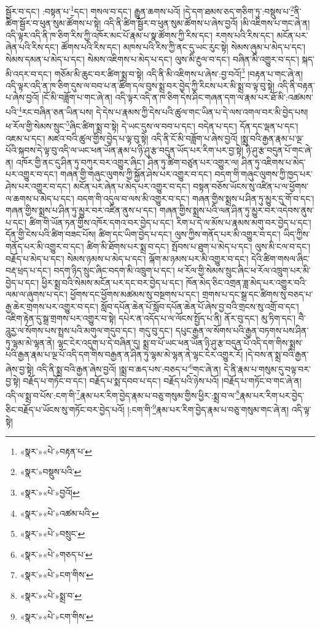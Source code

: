 སྦྱོར་བ་དང་། :བསྟན་པ་\footnote{«སྣར་»«པེ་»བརྟན་པ་}དང་། གསལ་བ་དང་། རྒྱུན་ཆགས་པའོ། །དེ་དག་ཐམས་ཅད་གཅིག་ཏུ་:བསྡུས་པ་\footnote{«སྣར་»བསྡུས་པའི་}ནི་ཚིག་སྦྱོར་བ་ཕུན་སུམ་ཚོགས་པ་སྟེ། འདི་ནི་ཚིག་སྦྱོར་བ་ཕུན་སུམ་ཚོགས་པ་ཞེས་བྱའོ། །མི་འཇིགས་པ་གང་ཞེ་ན། འདི་ལྟར་འདི་ནི་ཁ་ཅིག་རིས་ཀྱི་འཁོར་མང་པོ་རྣམ་པ་སྣ་ཚོགས་ཀྱི་རིས་དང་། རགས་པའི་རིས་དང་། མངོན་པར་ཞེན་པའི་རིས་དང་། ཚོགས་པའི་རིས་དང་། མཁས་པའི་རིས་ཀྱི་ནང་དུ་ཡང་རུང་སྟེ། སེམས་ཞུམ་པ་མེད་པ་དང་། སེམས་དམན་པ་མེད་པ་དང་། སེམས་འཇིགས་པ་མེད་པ་དང་། ལུས་མི་རྔུལ་བ་དང་། བཞིན་མི་འགྱུར་བ་དང་། སྐད་མི་འདར་བ་དང་། གཅོམ་མི་ཆུང་བར་ཚིག་སྨྲ་བ་སྟེ། འདི་ནི་མི་འཇིགས་པ་ཞེས་:བྱ་བའོ།\footnote{«སྣར་»«པེ་»བྱའོ།} །བརྟན་པ་གང་ཞེ་ན། འདི་ལྟར་འདི་ན་ཁ་ཅིག་དུས་ལ་བབ་པ་ན་ཚིག་དལ་བུས་སྨྲ་བར་བྱེད་ཀྱི་རིངས་པར་མི་སྨྲ་བ་ལྟ་བུ་སྟེ། འདི་ནི་བརྟན་པ་ཞེས་བྱའོ། །ངོ་མི་བཟློག་པ་གང་ཞེ་ན། འདི་ལྟར་འདི་ན་ཁ་ཅིག་དེས་ཤིང་གཞན་དག་ལ་རྣམ་པར་ཐོ་མི་:འཚམས་པའི་\footnote{«སྣར་»«པེ་»འཚམ་པའི་}རང་བཞིན་ཅན་ཡིན་པས། དེ་དེས་པ་རྣམས་ཀྱི་དེས་པའི་ཚུལ་གང་ཡིན་པ་དེ་ལས་འགལ་བར་མི་བྱེད་པས། ཕ་རོལ་གྱི་སེམས་སྲུང་\footnote{«སྣར་»«པེ་»བསྲུང་}ཞིང་ཚིག་སྨྲ་བ་སྟེ། དེ་ཡང་དུས་ལ་བབ་པ་དང་། བདེན་པ་དང་། དོན་དང་ལྡན་པ་དང་། འཇམ་པ་དང་། མཛའ་བའི་ཚུལ་གྱིས་བྱེད་པ་ལྟ་བུ་སྟེ། འདི་ནི་ངོ་མི་བཟློག་པ་ཞེས་བྱའོ། །སྨྲ་བའི་རྒྱན་རྣམ་པ་ལྔ་པོའི་སྐབས་དེ་ལྟ་བུ་འདི་ལ་ཡང་ཕན་ཡོན་རྣམ་པ་ཉི་ཤུ་རྩ་བདུན་ཡོད་པར་རིག་པར་བྱ་སྟེ། ཉི་ཤུ་རྩ་བདུན་པོ་གང་ཞེ་ན། འཁོར་གྱི་ནང་དུ་ཤིན་ཏུ་བཀུར་བར་འགྱུར་ཞིང་། ཤིན་ཏུ་ཚིག་བཙུན་པར་འགྱུར་ལ། ཤིན་ཏུ་འཇིགས་པ་མེད་པར་འགྱུར་བ་དང་། གཞན་གྱི་གཞུང་ལུགས་ཀྱི་སྐྱོན་ཤེས་པར་འགྱུར་བ་དང་། བདག་གི་གཞུང་ལུགས་ཀྱི་ཁྱད་པར་ཤེས་པར་འགྱུར་བ་དང་། མངོན་པར་ཞེན་པ་མེད་པར་འགྱུར་བ་དང་། བསྟན་བཅོས་ཡོངས་སུ་འཛིན་པ་ལ་ཕྱོགས་ལ་ཆགས་པ་མེད་པ་དང་། བདག་གི་འདུལ་བ་ལས་མི་འགྱུར་བ་དང་། གཞན་གྱིས་སྨྲས་པ་ཤིན་ཏུ་མྱུར་དུ་གོ་བ་དང་། གཞན་གྱིས་སྨྲས་པ་ཤིན་ཏུ་མྱུར་བར་འཛིན་ནུས་པ་དང་། གཞན་གྱིས་སྨྲས་པའི་ལན་ཤིན་ཏུ་མྱུར་བར་འདེབས་ནུས་པ་དང་། ཚིག་གི་ཡོན་ཏན་གྱིས་འཁོར་དགའ་བར་བྱེད་པ་དང་། རིག་པ་དེ་ལ་མོས་པ་རྣམས་མགུ་བར་བྱེད་པ་དང་། དོན་གྱི་ངེས་པའི་ཚིག་བཟང་པོས། ཚིག་དང་ཡིག་བྱེད་པ་དང་། ལུས་ཀྱིས་གནོད་པར་མི་འགྱུར་བ་དང་། ཡིད་ཀྱིས་གནོད་པར་མི་འགྱུར་བ་དང་། ཚིག་མི་ཐོགས་པར་སྨྲ་བ་དང་། སྤོབས་པ་ཐུག་པ་མེད་པ་དང་། ལུས་མི་ངལ་བ་དང་། བརྗོད་པ་མེད་པ་དང་། སེམས་ཉམས་པ་མེད་པ་དང་། ལྐོག་མ་ཉམས་པར་མི་འགྱུར་བ་དང་། དེའི་ཚིག་གསལ་ཞིང་བརྡ་ཕྲད་པ་དང་། བདག་ཉིད་སྲུང་ཞིང་བདག་མི་འཁྲུག་པ་དང་། ཕ་རོལ་གྱི་སེམས་སྲུང་ཞིང་ཕ་རོལ་འཁྲུག་པར་མི་བྱེད་པ་དང་། ཕྱིར་སྨྲ་བའི་སེམས་མངོན་པར་དང་བར་བྱེད་པ་དང་། ཁོན་མེད་ཅིང་འགྲན་ཟླ་མེད་པར་འགྱུར་བའི་ལམ་ལ་ཞུགས་པ་དང་། ཕྱོགས་དང་ཕྱོགས་མཚམས་སུ་བསྔགས་པ་དང་། གྲགས་པ་དང་སྒྲ་དང་ཚིགས་སུ་བཅད་པ་རྒྱ་ཆེར་གྲགས་པར་འགྱུར་བ་དང་། སློབ་དཔོན་ཆེན་པོ་སློབ་དཔོན་ཆེན་པོ་ཞེས་བྱ་བའི་གྲངས་སུ་འགྲོ་བ་དང་། འཇིག་རྟེན་དུ་སྒྲ་གྲགས་པར་འགྱུར་བ་སྟེ། དཔེར་ན་འདོད་པ་ལ་ལོངས་སྤྱོད་པ་ནི། ནོར་བུ་དང་། མུ་ཏིག་དང་། བཻ་ཌཱུརྱ་ལ་སོགས་པས་སྤྲས་པའི་མགུལ་གདུབ་དང་། གདུ་བུ་དང་། དཔུང་རྒྱན་ལ་སོགས་པའི་རྒྱན་བཏགས་པས་ཤིན་ཏུ་ལྷམ་མེ་ལྷན་ནེ། ལྷང་ངེར་འདུག་པ་དེ་བཞིན་དུ། སྨྲ་བ་པོ་ཡང་ཕན་ཡོན་ཉི་ཤུ་རྩ་བདུན་པོ་འདི་དག་གིས་སྨྲས་པའི་རྒྱན་རྣམ་པ་ལྔ་པོ་འདི་དག་གིས་བརྒྱན་ན་ཤིན་ཏུ་ལྷམ་མེ་ལྷན་ནེ་ལྷང་ངེར་འགྱུར་རོ། །དེ་བས་ན་སྨྲ་བའི་རྒྱན་ཞེས་བྱ་སྟེ། འདི་ནི་སྨྲ་བའི་རྒྱན་ཞེས་བྱའོ། །སྨྲ་བ་ཆད་པས་:བཅད་པ་\footnote{«སྣར་»«པེ་»གཅད་པ་}གང་ཞེ་ན། དེ་ནི་རྣམ་པ་གསུམ་དུ་བལྟ་བར་བྱ་སྟེ། བརྗོད་པ་གཏོང་བ་དང་། བརྗོད་པ་སྨ་དབབ་པ་དང་། བརྗོད་པའི་ཉེས་པའོ། །བརྗོད་པ་གཏོང་བ་གང་ཞེ་ན། འདི་ལ་སྨྲ་བ་པོས་:ངག་གི་\footnote{«སྣར་»«པེ་»ངག་གིས་}རྣམ་པར་རིག་བྱེད་རྣམ་པ་བཅུ་གསུམ་གྱིས་ཕྱིར་:སྨྲ་བ་ལ་\footnote{«སྣར་»«པེ་»སྨྲ་བ་}རྣམ་པར་རིག་པར་བྱེད་ཅིང་བརྗོད་པ་ཡོངས་སུ་གཏོང་བར་བྱེད་པའོ། །:ངག་གི་\footnote{«སྣར་»«པེ་»ངག་གིས་}རྣམ་པར་རིག་བྱེད་རྣམ་པ་བཅུ་གསུམ་གང་ཞེ་ན། འདི་ལྟ་སྟེ། 
